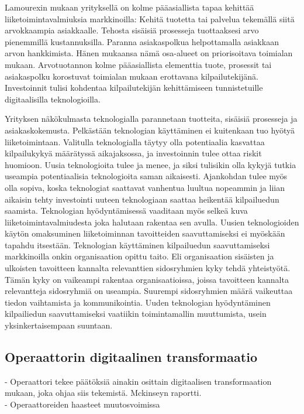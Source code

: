 \documentclass[finnish,12pt,a4paper,pdftex]{article}
\begin{document}
Lamourexin \citeyear{lamoureux} mukaan yrityksellä on kolme pääasiallista tapaa kehittää liiketoimintavalmiuksia markkinoilla: Kehitä tuotetta tai palvelua tekemällä siitä arvokkaampia asiakkaalle. Tehosta sisäisiä prosesseja tuottaaksesi arvo pienemmillä kustannuksilla. Paranna asiakaspolkua helpottamalla asiakkaan arvon hankkimista. Hänen mukaansa nämä osa-alueet on priorisoitava toimialan mukaan. Arvotuotannon kolme pääasiallista elementtia tuote, prosessit tai asiakaspolku korostuvat toimialan mukaan erottavana kilpailutekijänä. Investoinnit tulisi kohdentaa kilpailutekijän kehittämiseen tunnistetuille digitaalisilla teknologioilla.

Yrityksen näkökulmasta teknologialla parannetaan tuotteita, sisäisiä prosesseja ja asiakaskokemusta. Pelkästään teknologian käyttäminen ei kuitenkaan tuo hyötyä liiketoimintaan. Valitulla teknologialla täytyy olla potentiaalia kasvattaa kilpailukykyä määrätyssä aikajaksossa, ja investoinnin tulee ottaa riskit huomioon. Uusia teknologioita tulee ja menee, ja siksi tulisikin olla kykyjä tutkia useampia potentiaalisia teknologioita saman aikaisesti. Ajankohdan tulee myös olla sopiva, koska teknologiat saattavat vanhentua luultua nopeammin ja liian aikaisin tehty investointi uuteen teknologiaan saattaa heikentää kilpailuedun saamista. Teknologian hyödyntämisessä vaaditaan myös selkeä kuva liiketoimintavalmiudesta joka halutaan rakentaa sen avulla. Uusien teknologioiden käytön omaksuminen liiketoiminnan tavoitteiden saavuttamiseksi ei myöskään tapahdu itsestään. Teknologian käyttäminen kilpailuedun saavuttamiseksi markkinoilla onkin organisaation opittu taito. Eli organisaation sisäisten ja ulkoisten tavoitteen kannalta relevanttien sidosryhmien kyky tehdä yhteistyötä. Tämän kyky on vaikeampi rakentaa organisaatioissa, joissa tavoitteen kannalta relevantteja sidosryhmiä on useampia. Suurempi sidosryhmien määrä vaikeuttaa tiedon vaihtamista ja kommunikointia. Uuden teknologian hyödyntäminen kilpailiedun saavuttamiseksi vaatiikin toimintamallin muuttumista, usein yksinkertaisempaan suuntaan.

\subsection{Operaattorin digitaalinen transformaatio}

- Operaattori tekee päätöksiä ainakin osittain digitaalisen transformaation mukaan, joka ohjaa siis tekemistä. Mckinseyn raportti.\\
- Operaattoreiden haasteet muutosvoimissa
\end{document}
